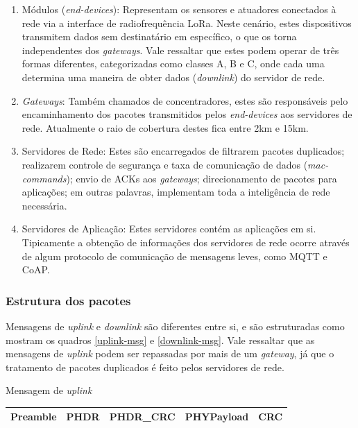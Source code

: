 \documentclass[oneside,openright,12pt]{ufsm_2015} %
\begin{document}
\begin{enumerate}
    \item Módulos (\textit{end-devices}): Representam os sensores e atuadores conectados à rede via a interface de radiofrequência LoRa. Neste cenário, estes dispositivos transmitem dados sem destinatário em específico, o que os torna independentes dos \textit{gateways}. Vale ressaltar que estes podem operar de três formas diferentes, categorizadas como classes A, B e C, onde cada uma determina uma maneira de obter dados (\textit{downlink}) do servidor de rede.
    \item \textit{Gateways}: Também chamados de concentradores, estes são responsáveis pelo encaminhamento dos pacotes transmitidos pelos \textit{end-devices} aos servidores de rede. Atualmente o raio de cobertura destes fica entre 2km e 15km.
    \item Servidores de Rede: Estes são encarregados de filtrarem pacotes duplicados; realizarem controle de segurança e taxa de comunicação de dados (\textit{mac-commands}); envio de ACKs aos \textit{gateways}; direcionamento de pacotes para aplicações; em outras palavras, implementam toda a inteligência de rede necessária.
    \item Servidores de Aplicação: Estes servidores contém as aplicações em si. Tipicamente a obtenção de informações dos servidores de rede ocorre através de algum protocolo de comunicação de mensagens leves, como MQTT e CoAP.
\end{enumerate}

\subsubsection{Estrutura dos pacotes}
Mensagens de \textit{uplink} e \textit{downlink} são diferentes entre si, e são estruturadas como mostram os quadros \ref{uplink-msg} e \ref{downlink-msg}. Vale ressaltar que as mensagens de \textit{uplink} podem ser repassadas por mais de um \textit{gateway}, já que o tratamento de pacotes duplicados é feito pelos servidores de rede.

\begin{quadro}
   	    \caption{Mensagem de \textit{uplink}}
	    \centering
	    \begin{tabular}{| c | c | c | c | c |}
	    \hline
	    Preamble & PHDR & PHDR\_CRC & PHYPayload & CRC \\
	    \hline
	    \end{tabular}
	    \vspace{\baselineskip} %
	    \label{uplink-msg}
\end{quadro}
\end{document}
